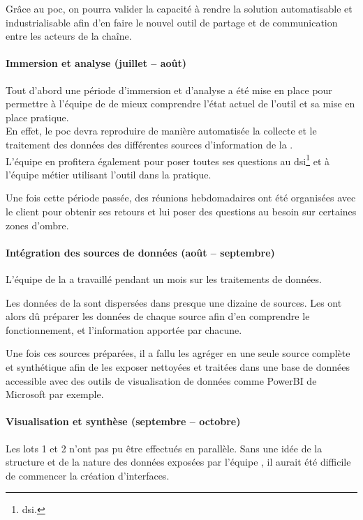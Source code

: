 Grâce au \gls{poc}, on pourra valider la capacité à rendre la solution automatisable et industrialisable afin d'en faire le nouvel outil de partage et de communication entre les acteurs de la chaîne.


\paragraph{Immersion et analyse (juillet -- août)}

Tout d'abord une période d'\og immersion et d'analyse \fg a été mise en place pour permettre à l'équipe de \tnp de mieux comprendre l'état actuel de l'outil et sa mise en place pratique.\\
En effet, le \gls{poc} devra reproduire de manière automatisée la collecte et le traitement des données des différentes sources d'information de la \sncf.\\ L'équipe en profitera également pour poser toutes ses questions au
\gls{dsi}\footnote{\glsdesc{dsi}.}
et à l'équipe métier utilisant l'outil dans la pratique.


Une fois cette période passée, des réunions hebdomadaires ont été organisées avec le client pour obtenir ses retours et lui poser des questions au besoin sur certaines zones d'ombre.

\paragraph{Intégration des sources de données (août -- septembre)}

L'équipe \ds de la \df a travaillé pendant un mois sur les traitements de données.

Les données de la \sncf sont dispersées dans presque une dizaine de sources. Les \ds ont alors dû préparer les données de chaque source afin d'en comprendre le fonctionnement, et l'information apportée par chacune.

Une fois ces sources préparées, il a fallu les agréger en une seule source complète et synthétique afin de les exposer nettoyées et traitées dans une base de données accessible avec des outils de visualisation de données comme PowerBI de Microsoft par exemple.

\paragraph{Visualisation et synthèse (septembre -- octobre)}

Les lots 1 et 2 n'ont pas pu être effectués en parallèle. Sans une idée de la structure et de la nature des données exposées par l'équipe \ds, il aurait été difficile de commencer la création d'interfaces.


